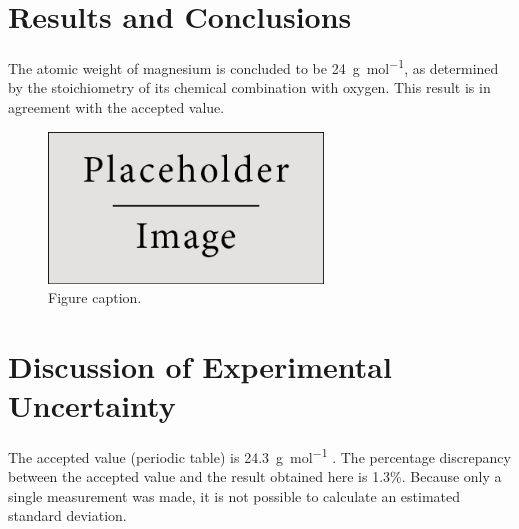 \documentclass{article}
\begin{document}
	
	
	\section{Results and Conclusions}
	
	The atomic weight of magnesium is concluded to be \SI{24}{\gram\per\mol}, as determined by the stoichiometry of its chemical combination with oxygen. This result is in agreement with the accepted value.
	
	\begin{figure}[h]
		\begin{center}
			\includegraphics[width=0.65\textwidth]{placeholder} %
			\caption{Figure caption.}
		\end{center}
	\end{figure}
	
	
	\section{Discussion of Experimental Uncertainty}
	
	The accepted value (periodic table) is \SI{24.3}{\gram\per\mole} \cite{Smith:2012qr}. The percentage discrepancy between the accepted value and the result obtained here is 1.3\%. Because only a single measurement was made, it is not possible to calculate an estimated standard deviation.
	
\end{document}

